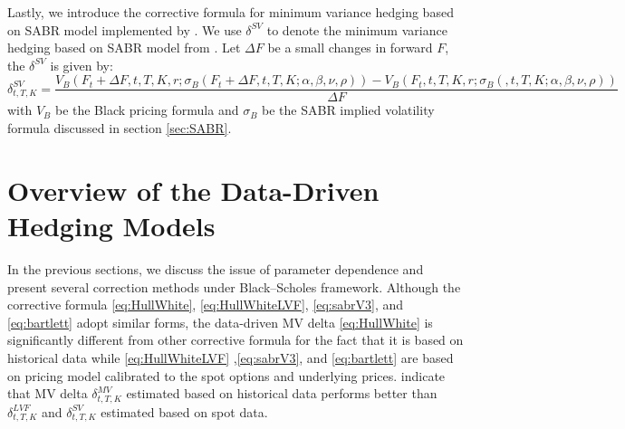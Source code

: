 \documentclass[letterpaper,12pt,titlepage,oneside,final]{book}
\numberwithin{equation}{section}
\theoremstyle{definition}
\begin{document}
Lastly, we introduce the corrective formula for minimum variance hedging  based on  SABR model implemented by  \citet{hulloptimal} . We use $\delta^{SV}$ to denote the minimum variance hedging  based on  SABR model from \cite{hulloptimal}. Let $\Delta F$ be a small changes in forward $F$, the  $\delta^{SV}$ is given by:
\begin{equation}
	\delta^{SV}_{t,T,K}=\frac{V_B(F_t+\Delta F,t,T,K,r;\sigma_B (F_t+\Delta F,t,T,K;\alpha,\beta,\nu,\rho))-V_B(F_t,t,T,K,r;\sigma_B (,t,T,K;\alpha,\beta,\nu,\rho))}{\Delta F}
	\label{eq:HullWhiteSabr}
\end{equation}
with $V_B$ be the Black pricing formula and $\sigma_B$ be the SABR implied volatility formula discussed in section \ref{sec:SABR}. 

\section{Overview of the Data-Driven Hedging Models}
In the previous sections, we discuss the issue of parameter dependence and present several correction methods under Black–Scholes framework. Although the corrective formula   \eqref{eq:HullWhite}, \eqref{eq:HullWhiteLVF}, \eqref{eq:sabrV3}, and \eqref{eq:bartlett} adopt similar forms, the data-driven MV delta \eqref{eq:HullWhite} is significantly different from other corrective formula for the fact that it is based on historical data while \eqref{eq:HullWhiteLVF} ,\eqref{eq:sabrV3}, and \eqref{eq:bartlett} are based on pricing model calibrated to the spot options and underlying prices. \citet{hulloptimal} indicate that MV delta $\delta^{MV}_{t,T,K}$ estimated based on historical data performs better than $\delta^{LVF}_{t,T,K}$ and $\delta^{SV}_{t,T,K}$ estimated based on spot data. 
\end{document}
